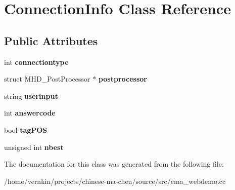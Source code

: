 \section{ConnectionInfo Class Reference}
\label{classConnectionInfo}
\subsection*{Public Attributes}
\begin{DoxyCompactItemize}
\item 
int {\bfseries connectiontype}\label{classConnectionInfo_a976135c364167c26a1420869ab6ce5d8}

\item 
struct MHD\_\-PostProcessor $\ast$ {\bfseries postprocessor}\label{classConnectionInfo_aa87318e759bfd602d7186f19ca33a75d}

\item 
string {\bfseries userinput}\label{classConnectionInfo_af8b88863cb6866d374468aa6935fba45}

\item 
int {\bfseries answercode}\label{classConnectionInfo_afb479eccd99f0884f22b68981fed9422}

\item 
bool {\bfseries tagPOS}\label{classConnectionInfo_a0bfa5b7b67d25f952c5948d8d28da666}

\item 
unsigned int {\bfseries nbest}\label{classConnectionInfo_ad1bcb612195d87124a1aed8cca71a0ab}

\end{DoxyCompactItemize}


The documentation for this class was generated from the following file:\begin{DoxyCompactItemize}
\item 
/home/vernkin/projects/chinese-\/ma-\/chen/source/src/cma\_\-webdemo.cc\end{DoxyCompactItemize}
